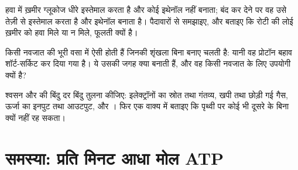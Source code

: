 \begin{exercise}[$\star\star\star$]\label{exo:g12:respiration-fermentation:13}
हवा में ख़मीर ग्लूकोज धीरे इस्तेमाल करता है और कोई इथेनॉल नहीं बनाता; बंद
कर देने पर वह उसे तेज़ी से इस्तेमाल करता है और इथेनॉल बनाता है। पैदावारों
से समझाइए, और बताइए कि रोटी की लोई ख़मीर को हवा मिले या न मिले, फूलती क्यों
है।
\end{exercise}

\begin{exercise}[$\star\star\star$]\label{exo:g12:respiration-fermentation:14}
किसी नवजात की भूरी वसा  में ऐसी  होती हैं जिनकी शृंखला
बिना  बनाए चलती है: यानी वह प्रोटॉन बहाव शॉर्ट-सर्किट कर दिया गया है।
ये  उसकी जगह क्या बनाती हैं, और वह किसी नवजात के लिए उपयोगी क्यों है?
\end{exercise}

\begin{exercise}[$\star\star\star$]\label{exo:g12:respiration-fermentation:15}
श्वसन और  की बिंदु दर बिंदु तुलना कीजिए: इलेक्ट्रॉनों का
स्रोत तथा गंतव्य, खपी तथा छोड़ी गई गैस, ऊर्जा का इनपुट तथा आउटपुट, और
। फिर एक वाक्य में बताइए कि पृथ्वी पर कोई भी दूसरे के बिना क्यों
नहीं रह सकता।
\end{exercise}

\section{समस्या: प्रति मिनट आधा मोल ATP}

